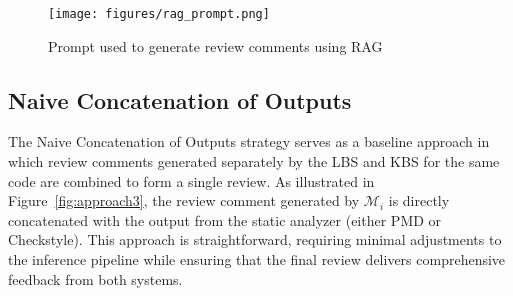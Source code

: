 \begin{figure}[htbp!]
  \centering
  \texttt{[image: figures/rag\_prompt.png]}
  \caption{Prompt used to generate review comments using RAG}
  \label{fig:rag_prompt}
\end{figure}



\subsection{Naive Concatenation of Outputs}

The Naive Concatenation of Outputs strategy serves as a baseline approach in which review comments generated separately by the LBS and KBS for the same code are combined to form a single review. As illustrated in Figure~\ref{fig:approach3}, the review comment generated by \(\mathcal{M}_i\) is directly concatenated with the output from the static analyzer (either PMD or Checkstyle).
This approach is straightforward, requiring minimal adjustments to the inference pipeline while ensuring that the final review delivers comprehensive feedback from both systems.











